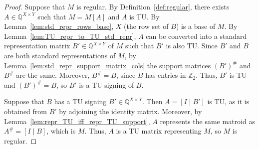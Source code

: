 \begin{proof}
    Suppose that $M$ is regular. By Definition~\ref{def:regular}, there exists $A \in \mathbb{Q}^{X \times Y}$ such that $M = M[A]$ and $A$ is TU. By Lemma~\ref{lem:std_repr_rows_base}, $X$ (the row set of $B$) is a base of $M$. By Lemma~\ref{lem:TU_repr_to_TU_std_repr}, $A$ can be converted into a standard representation matrix $B' \in \mathbb{Q}^{X \times Y}$ of $M$ such that $B'$ is also TU. Since $B'$ and $B$ are both standard representations of $M$, by Lemma~\ref{lem:std_repr_support_matrix_cols} the support matrices $(B')^{\#}$ and $B^{\#}$ are the same. Moreover, $B^{\#} = B$, since $B$ has entries in $\mathbb{Z}_{2}$. Thus, $B'$ is TU and $(B')^{\#} = B$, so $B'$ is a TU signing of $B$.

    Suppose that $B$ has a TU signing $B' \in \mathbb{Q}^{X \times Y}$. Then $A = [I \mid B']$ is TU, as it is obtained from $B'$ by adjoining the identity matrix. Moreover, by Lemma~\ref{lem:repr_TU_iff_repr_TU_support}, $A$ represents the same matroid as $A^{\#} = [I \mid B]$, which is $M$. Thus, $A$ is a TU matrix representing $M$, so $M$ is regular.
\end{proof}
